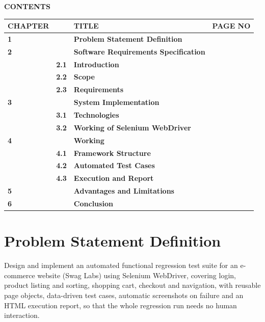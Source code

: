 \documentclass[12pt,a4paper]{article}
\begin{document}
\begin{center}{\large\bfseries CONTENTS}\end{center}
\vspace{0.3cm}
\renewcommand{\arraystretch}{1.6}
\begin{tabular}{|p{1.8cm}|p{1.2cm}|p{8cm}|p{2.2cm}|}
\hline
\textbf{CHAPTER} & & \textbf{TITLE} & \textbf{PAGE NO}\\ \hline
\textbf{1} & & \textbf{Problem Statement Definition} & \pageref{sec:ps}\\ \hline
\textbf{2} & & \textbf{Software Requirements Specification} & \pageref{sec:srs}\\ \hline
 & \textbf{2.1} & \textbf{Introduction} & \pageref{sec:srs1}\\ \hline
 & \textbf{2.2} & \textbf{Scope} & \pageref{sec:srs2}\\ \hline
 & \textbf{2.3} & \textbf{Requirements} & \pageref{sec:srs3}\\ \hline
\textbf{3} & & \textbf{System Implementation} & \pageref{sec:impl}\\ \hline
 & \textbf{3.1} & \textbf{Technologies} & \pageref{sec:impl1}\\ \hline
 & \textbf{3.2} & \textbf{Working of Selenium WebDriver} & \pageref{sec:impl2}\\ \hline
\textbf{4} & & \textbf{Working} & \pageref{sec:work}\\ \hline
 & \textbf{4.1} & \textbf{Framework Structure} & \pageref{sec:work1}\\ \hline
 & \textbf{4.2} & \textbf{Automated Test Cases} & \pageref{sec:work2}\\ \hline
 & \textbf{4.3} & \textbf{Execution and Report} & \pageref{sec:work3}\\ \hline
\textbf{5} & & \textbf{Advantages and Limitations} & \pageref{sec:adv}\\ \hline
\textbf{6} & & \textbf{Conclusion} & \pageref{sec:concl}\\ \hline
\end{tabular}
\newpage

\section{Problem Statement Definition}\label{sec:ps}
Design and implement an automated functional regression test suite for an e-commerce website (Swag Labs) using Selenium WebDriver, covering login, product listing and sorting, shopping cart, checkout and navigation, with reusable page objects, data-driven test cases, automatic screenshots on failure and an HTML execution report, so that the whole regression run needs no human interaction.
\end{document}
